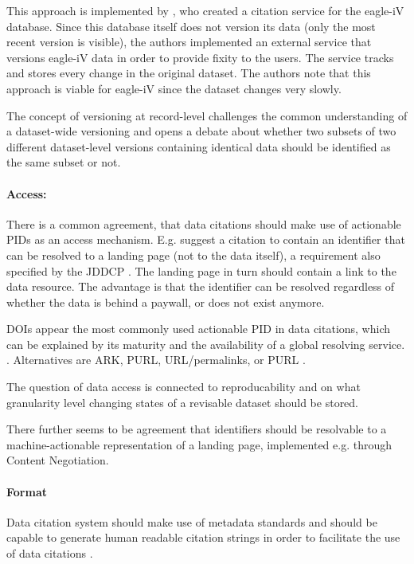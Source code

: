 \documentclass[a4paper,10pt]{article}
\begin{document}
This approach is implemented by \cite{Alawini2017}, who created a citation service for the eagle-iV database. Since this database itself does not version its data (only the most recent version is visible), the authors implemented an external service that versions eagle-iV data in order to provide fixity to the users. The service tracks and stores every change in the original dataset.  The authors note that this approach is viable for eagle-iV since the dataset changes very slowly.

The concept of versioning at record-level challenges the common understanding of a dataset-wide versioning and opens a debate about whether two subsets of two different dataset-level versions containing identical data should be identified as the same subset or not. 


\paragraph{Access:}
There is a common agreement, that data citations should make use of actionable \glspl{PID} as an access mechanism. E.g. \cite{AltKin07} suggest a citation to contain an identifier that can be resolved to a landing page (not to the data itself), a requirement also specified by the \gls{JDDCP} \citep{Fenner2016}.
The landing page in turn should contain a link to the data resource. The advantage is that the identifier can be resolved regardless of whether the data is behind a paywall, or does not exist anymore.

\glspl{DOI} appear the most commonly used actionable \gls{PID} in data citations, which can be explained by its maturity and the availability of a global resolving service.  \citep{Honor2016}. Alternatives are \gls{ARK}, \gls{PURL}, \gls{URL}/permalinks, or \gls{PURL} \citep{Klump2016, Starr2015}.

The question of data access is connected to reproducability and on what granularity level changing states of a revisable dataset should be stored.


There further seems to be agreement that identifiers should be resolvable to a machine-actionable representation of a landing page, implemented e.g. through Content Negotiation.

\paragraph{Format}
Data citation system should make use of metadata standards \citep{CODATA2013} and should be capable to generate human readable citation strings in order to facilitate the use of data citations \citep{Buneman2016, Rauber2015}. 
\end{document}
